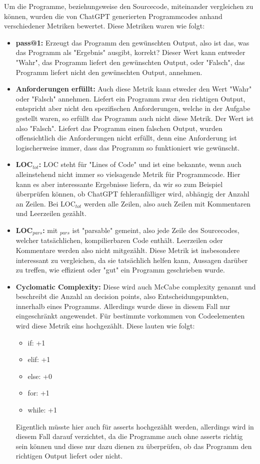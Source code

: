 \documentclass[class=scrbook, crop=false]{standalone}
\begin{document}
    Um die Programme, beziehungsweise den Sourcecode, miteinander vergleichen zu können, wurden die von ChatGPT generierten Programmcodes anhand verschiedener Metriken bewertet.
    Diese Metriken waren wie folgt:
    \begin{itemize}
    \item \textbf{pass@1:} Erzeugt das Programm den gewünschten Output, also ist das, was das Programm als "Ergebnis" ausgibt, korrekt?
    Dieser Wert kann entweder "Wahr", das Programm liefert den gewünschten Output, oder "Falsch", das Programm liefert nicht den gewünschten Output, annehmen.
    \item \textbf{Anforderungen erfüllt:} Auch diese Metrik kann etweder den Wert "Wahr" oder "Falsch" annehmen.
    Liefert ein Programm zwar den richtigen Output, entspricht aber nicht den spezifischen Anforderungen, welche in der Aufgabe gestellt waren,
    so erfüllt das Programm auch nicht diese Metrik. Der Wert ist also "Falsch".
    Liefert das Programm einen falschen Output, wurden offensichtlich die Anforderungen nicht erfüllt,
    denn eine Anforderung ist logischerweise immer, dass das Programm so funktioniert wie gewünscht.
    \item \textbf{LOC$_{tot}$:} LOC steht für "Lines of Code" und ist eine bekannte, wenn auch alleinstehend nicht immer so vielsagende Metrik für Programmcode.
    Hier kann es aber interessante Ergebnisse liefern, da wir so zum Beispiel überprüfen können, ob ChatGPT fehleranfälliger wird, abhängig der Anzahl an Zeilen.
    Bei LOC$_{tot}$ werden alle Zeilen, also auch Zeilen mit Kommentaren und Leerzeilen gezählt.
    \item \textbf{LOC$_{pars}$:} mit $_{pars}$ ist "parsable" gemeint, also jede Zeile des Sourcecodes, welcher tatsächlichen, kompilierbaren Code enthält.
    Leerzeilen oder Kommentare werden also nicht mitgezählt.
    Diese Metrik ist insbesondere interessant zu vergleichen, da sie tatsächlich helfen kann, Aussagen darüber zu treffen, wie effizient oder "gut" ein Programm geschrieben wurde.
    \item \textbf{Cyclomatic Complexity:} Diese wird auch McCabe complexity genannt und beschreibt die Anzahl an decision points,
    also Entscheidungspunkten, innerhalb eines Programms.
    Allerdings wurde diese in diesem Fall nur eingeschränkt angewendet.
    Für bestimmte vorkommen von Codeelementen wird diese Metrik eins hochgezählt.
    Diese lauten wie folgt:
        \begin{itemize}
            \item if: +1
            \item elif: +1
            \item else: +0
            \item for: +1
            \item while: +1
        \end{itemize}
    Eigentlich müsste hier auch für asserts hochgezählt werden, allerdings wird in diesem Fall darauf verzichtet, da die
    Programme auch ohne asserts richtig sein können und diese nur dazu dienen zu überprüfen, ob das Programm den richtigen Output liefert oder nicht.
    \end{itemize}
\end{document}
